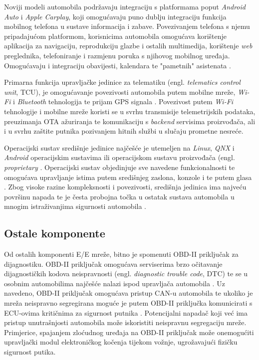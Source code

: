 \documentclass[times, utf8, diplomski, numeric]{fer}
\begin{document}
Noviji modeli automobila podržavaju integraciju s platformama poput \textit{Android Auto} i \textit{Apple Carplay}, koji omogućavaju puno dublju integraciju funkcija mobilnog telefona u sustave informacija i zabave. Povezivanjem telefona s njemu pripadajućom platformom, korisnicima automobila omogućava korištenje aplikacija za navigaciju, reprodukciju glazbe i ostalih multimedija, korištenje \textit{web} preglednika, telefoniranje i razmjenu poruka s njihovog mobilnog uređaja. Omogućavaju i integraciju obavijesti, kalendara te "pametnih" asistenata \cite{androidauto, carplay}.

Primarna funkcija upravljačke jedinice za telematiku (engl. \textit{telematics control unit}, TCU), je omogućavanje povezivosti automobila putem mobilne mreže, \textit{Wi-Fi} i \textit{Bluetooth} tehnologija te prijam GPS signala \cite{nasser2023automotive}. Povezivost putem \textit{Wi-Fi} tehnologije i mobilne mreže koristi se u svrhu transmisije telemetrijskih podataka, preuzimanja OTA ažuriranja te komunikaciju s \textit{backend} servisima proizvođača, ali i u svrhu zaštite putnika pozivanjem hitnih službi u slučaju prometne nesreće.

Operacijski sustav središnje jedinice najčešće je utemeljen na \textit{Linux}, \textit{QNX} i \textit{Android} operacijskim sustavima ili operacijskom sustavu proizvođača (engl. \textit{proprietary} \cite{nasser2023automotive}. Operacijski sustav objedinjuje sve navedene funkcionalnosti te omogućava upravljanje istima putem središnjeg zaslona, konzole i te putem glasa \cite{bosch2022handbook}. Zbog visoke razine kompleksnosti i povezivosti, središnja jedinica ima najveću površinu napada te je česta probojna točka u ostatak sustava automobila u mnogim istraživanjima sigurnosti automobila \cite{aliwa2021cyberattacks, knight2020hacking, smith2016car, tencent2018bmw, miller2015remote}.

\subsection{Ostale komponente}
Od ostalih komponenti E/E mreže, bitno je spomenuti OBD-II priključak za dijagnostiku. OBD-II priključak omogućava serviserima brzo očitavanje dijagnostičkih kodova neispravnosti (engl. \textit{diagnostic trouble code}, DTC) te se u osobnim automobilima najčešće nalazi ispod upravljača automobila \cite{smith2016car}. Uz navedeno, OBD-II priključak omogućava pristup CAN-u automobila te ukoliko je mreža neispravno segregirana moguće je putem OBD-II priključka  komunicirati s ECU-ovima kritičnima za sigurnost putnika \cite{knight2020hacking, smith2016car}. Potencijalni napadač koji već ima pristup unutrašnjosti automobila može iskoristiti neispravnu segregaciju mreže. Primjerice, spajanjem zloćudnog uređaja na OBD-II priključak može onemogućiti upravljački modul elektroničkog kočenja tijekom vožnje, ugrožavajući fizičku sigurnost putika.  
\end{document}
